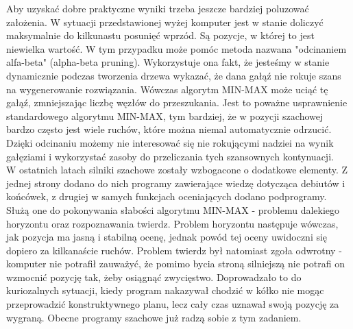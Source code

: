 \documentclass[12pt,leqno]{article}
\begin{document}
Aby uzyskać dobre praktyczne wyniki trzeba jeszcze bardziej poluzować założenia. W sytuacji przedstawionej wyżej komputer jest w stanie doliczyć maksymalnie do kilkunastu posunięć wprzód. Są pozycje, w której to jest niewielka wartość. W tym przypadku może pomóc metoda nazwana "odcinaniem alfa-beta" (alpha-beta pruning). Wykorzystuje ona fakt, że jesteśmy w stanie dynamicznie podczas tworzenia drzewa wykazać, że dana gałąź nie rokuje szans na wygenerowanie rozwiązania. Wówczas algorytm MIN-MAX może uciąć tę gałąź, zmniejszając liczbę węzłów do przeszukania. Jest to poważne usprawnienie standardowego algorytmu MIN-MAX, tym bardziej, że w pozycji szachowej bardzo często jest wiele ruchów, które można niemal automatycznie odrzucić. Dzięki odcinaniu możemy nie interesować się nie rokującymi nadziei na wynik gałęziami i wykorzystać zasoby do przeliczania tych szansownych kontynuacji. \\
W ostatnich latach silniki szachowe zostały wzbogacone o dodatkowe elementy. Z jednej strony dodano do nich programy zawierające wiedzę dotycząca debiutów i końcówek, z drugiej w samych funkcjach oceniających dodano podprogramy. Służą one do pokonywania słabości algorytmu MIN-MAX - problemu dalekiego horyzontu oraz rozpoznawania twierdz. Problem horyzontu następuje wówczas, jak pozycja ma jasną i stabilną ocenę, jednak powód tej oceny uwidoczni się dopiero za kilkanaście ruchów. Problem twierdz był natomiast zgoła odwrotny - komputer nie potrafił zauważyć, że pomimo bycia stroną silniejszą nie potrafi on wzmocnić pozycję tak, żeby osiągnąć zwycięstwo. Doprowadzało to do kuriozalnych sytuacji, kiedy program nakazywał chodzić w kółko nie mogąc przeprowadzić konstruktywnego planu, lecz cały czas uznawał swoją pozycję za wygraną. Obecne programy szachowe już radzą sobie z tym zadaniem. 

\end{document}
